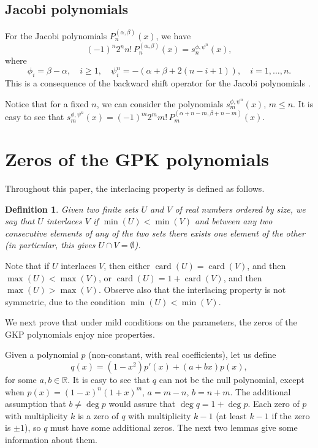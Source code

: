 \documentclass[10pt, a4paper, leqno]{amsart}
\numberwithin{equation}{section}
\theoremstyle{plain}
\newtheorem{Def}{Definition}[section]
\theoremstyle{remark}
\newcommand{\RR}{\mathbb{R}}
\newcommand{\card}{\operatorname{card}}
\begin{document}
\subsection{Jacobi polynomials}

For the Jacobi polynomials $P_n^{(\alpha,\beta)}(x)$, we have
\[
  (-1)^n 2^n n!\,P_n^{(\alpha,\beta)}(x) = s_n^{\phi,\psi^n}(x),
\]
where
\[
  \phi_i = \beta-\alpha, \quad i\ge 1, \quad \psi_i^n = -(\alpha+\beta+2(n-i+1)),\quad i=1,\dots, n.
\]
This is a consequence of the backward shift operator for the Jacobi polynomials \cite[(9.8.8), p.~218]{KLS}.

Notice that for a fixed $n$, we can consider the polynomials $s_m^{\phi,\psi^n}(x)$, $m\le n$. 
It is easy to see that
$s_m^{\phi,\psi^n}(x) = (-1)^m 2^m m!\,P_m^{(\alpha+n-m,\beta+n-m)}(x)$.

\section{Zeros of the GPK polynomials}
\label{sec3}

Throughout this paper, the interlacing property is defined as follows.

\begin{Def}
\label{dip}
Given two finite sets $U$ and $V$ of real numbers ordered by size, we say that $U$ interlaces $V$ if $\min(U)<\min(V)$ and between any two consecutive elements of any of the two sets there exists one element of the other (in particular, this gives $U\cap V=\emptyset$).
\end{Def}

Note that if $U$ interlaces $V$, then either $\card(U) = \card(V)$, and then $\max(U) < \max(V)$, or $\card(U) = 1 + \card(V)$, and then $\max(U) > \max(V)$. Observe also that the interlacing property is not symmetric, due to the condition $\min(U) < \min(V)$.

We next prove that under mild conditions on the parameters, the zeros of the GKP polynomials enjoy nice properties.

Given a polynomial $p$ (non-constant, with real coefficients), let us define
\[
  q(x) = (1-x^2) p'(x) + (a+bx) p(x),
\]
for some $a, b \in \RR$. It is easy to see that $q$ can not be the null polynomial, except when $p(x) = (1-x)^n (1+x)^m$, $a = m-n$, $b = n+m$. The additional assumption that $b \ne \deg p$ would assure that $\deg q = 1 + \deg p$. Each zero of $p$ with multiplicity $k$ is a zero of $q$ with multiplicity $k-1$ (at least $k-1$ if the zero is $\pm 1$), so $q$ must have some additional zeros. The next two lemmas give some information about them.
\end{document}
